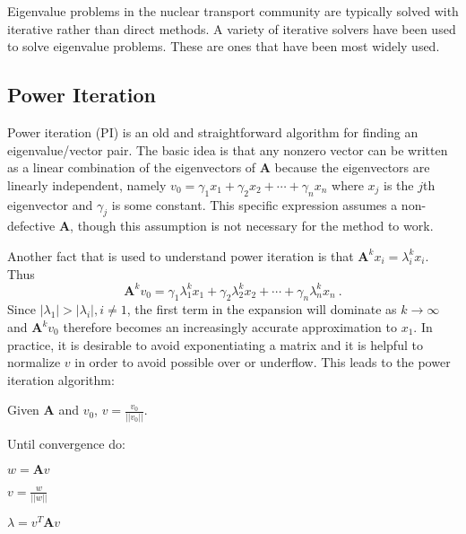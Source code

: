 \documentclass[12pt]{article}
\newcommand{\ve}[1]{\ensuremath{\mathbf{#1}}}
\begin{document}
Eigenvalue problems in the nuclear transport community are typically solved with iterative rather than direct methods. A variety of iterative solvers have been used to solve eigenvalue problems. These are ones that have been most widely used. 

\subsection*{Power Iteration}
Power iteration (PI) is an old and straightforward algorithm for finding an eigenvalue/vector pair. The basic idea is that any nonzero vector can be written as a linear combination of the eigenvectors of $\ve{A}$ because the eigenvectors are linearly independent, namely $v_0 = \gamma_1 x_1 + \gamma_2 x_2 + \cdots + \gamma_n x_n$ where $x_{j}$ is the $j$th eigenvector and $\gamma_{j}$ is some constant. This specific expression assumes a non-defective $\ve{A}$, though this assumption is not necessary for the method to work. 

Another fact that is used to understand power iteration is that $\ve{A}^k x_i = \lambda_i^k x_i$. Thus
%
\begin{equation}
  \ve{A}^k v_{0} = \gamma_1 \lambda_1^k x_1 + \gamma_2 \lambda_2^k x_2 + \cdots + \gamma_n \lambda_n^k x_n \:.
  \label{eq:Ak}
\end{equation}
%
Since $|\lambda_1| > |\lambda_i|, i \ne 1$, the first term in the expansion will dominate as $k \to \infty$ and $\ve{A}^k v_{0}$ therefore becomes an increasingly accurate approximation to $x_1$. In practice, it is desirable to avoid exponentiating a matrix and it is helpful to normalize $v$ in order to avoid possible over or underflow. This leads to the power iteration algorithm:%
%
\begin{list}{}{}
  \item Given $\ve{A}$ and $v_0$, $v = \frac{v_{0}}{||v_{0}||}$.
  \item Until convergence do:
  \begin{list}{}{\hspace{2em}}
    \item $w = \ve{A}v$
    \item $v = \frac{w}{||w||}$
    \item $\lambda = v^{T}\ve{A}v$
  \end{list}
\end{list}
\end{document}
